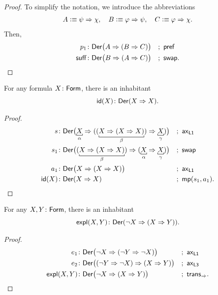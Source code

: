 \begin{proof}
    To simplify the notation, we introduce the abbreviations
    \begin{align*}
        A\mathrel{\vcentcolon}\equiv\psi\mathrel{\Rightarrow}\chi,\quad
        B\mathrel{\vcentcolon}\equiv\varphi\mathrel{\Rightarrow}\psi,\quad
        C\mathrel{\vcentcolon}\equiv\varphi\mathrel{\Rightarrow}\chi.
    \end{align*}
    Then,
    \begin{align*}
        p_1&\colon\fun{Der}\bigl(A\imp(B\imp C)\bigr)
            &&;\ \fun{pref}\\
        \fun{suff}&\colon\fun{Der}\bigl(
            B\imp(A\imp C)
        \bigr)
            &&;\ \fun{swap}.
    \end{align*}
\end{proof}

\begin{lem}[Identity]\label{lem:identity}
    For any formula $X\colon\fun{Form}$, there is an inhabitant
    \[
        \fun{id}(X)\colon\fun{Der}(X\imp X).
    \]
\end{lem}

\begin{proof}
    \begin{align*}
        s&\colon\fun{Der}\bigl(
            \explain[\alpha]{X}
            \imp(
                (\explain[\beta]{X\imp(X\imp X)})
                \imp\explain[\gamma]{X}
            )
        \bigr)
            &&;\ \fun{ax}_{\fun{L1}}\\
        s_1&\colon\fun{Der}\bigl(
            (\explain[\beta]{X\imp(X\imp X)})
            \imp(
                \explain[\alpha]{X}
                \imp\explain[\gamma]{X}
            )
        \bigr)
            &&;\ \fun{swap}\\
        a_1&\colon\fun{Der}\bigl(X\imp(X\imp X)\bigr)
            &&;\ \fun{ax}_{\fun{L1}}\\
        \fun{id}(X)&\colon\fun{Der}(X\imp X)
            &&;\ \fun{mp}(s_1,a_1).
    \end{align*}
\end{proof}

\begin{lem}[Explosion]
    \label{lem:explosion}
    For any\/ $X,Y\colon\fun{Form}$, there is an inhabitant
    \[
        \fun{expl}(X,Y)\colon\fun{Der}(\neg X\imp(X\imp Y)).
    \]
\end{lem}

\begin{proof}
    \begin{align*}
        e_1&\colon\fun{Der}\bigl(
            \neg X\imp(\neg Y\imp\neg X)
        \bigr)
            &&;\ \fun{ax}_{\fun{L1}}\\
        e_2&\colon\fun{Der}\bigl(
            (\neg Y\imp\neg X)\imp(X\imp Y)
        \bigr)
            &&;\ \fun{ax}_{\fun{L3}}\\
        \fun{expl}(X,Y)&\colon\fun{Der}\bigl(
            \neg X\imp(X\imp Y)
        \bigr)
            &&;\ \fun{trans}_{\imp}.
    \end{align*}
\end{proof}

